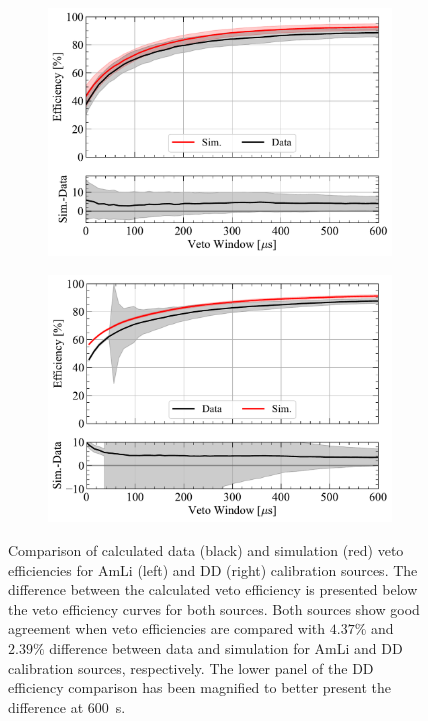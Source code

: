 \begin{figure}[h!]
    \centering
    \begin{subfigure}[b]{0.49\textwidth}
        \centering
        \includegraphics[width=\textwidth]{figures/VetoEfficiency/AmLi_Total_Avg_Ratio.pdf}
        \caption{}
        \label{fig:VetoEff/Sim2DataVetoEffComparisons_AmLi}
    \end{subfigure}
    \hfill
    \begin{subfigure}[b]{0.49\textwidth}
        \centering
        \includegraphics[width=\textwidth]{figures/VetoEfficiency/DDDirect_Total_Ratio.pdf}
        \caption{}
        \label{fig:VetoEff/Sim2DataVetoEffComparisons_DD}
    \end{subfigure}
    \caption[Comparison of calculated data and simulation veto efficiencies for AmLi and DD calibration sources.]{Comparison of calculated data (black) and simulation (red) veto efficiencies for AmLi (left) and DD (right) calibration sources. The difference between the calculated veto efficiency is presented below the veto efficiency curves for both sources. Both sources show good agreement when veto efficiencies are compared with $4.37\%$ and $2.39\%$ difference between data and simulation for AmLi and DD calibration sources, respectively. The lower panel of the DD efficiency comparison has been magnified to better present the difference at 600~\textmu s.}
    \label{fig:VetoEff/Sim2DataVetoEffComparisons}
\end{figure}



